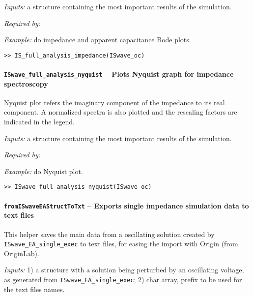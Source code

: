 	\textit{Inputs:} a structure containing the most important results of the simulation.



	\textit{Required by:}

	\textit{Example:} do impedance and apparent capacitance Bode plots.
	\begin{lstlisting}[style=Matlab-editor]
>> IS_full_analysis_impedance(ISwave_oc)
\end{lstlisting}

	\paragraph{\texttt{ISwave\_full\_analysis\_nyquist} -- Plots Nyquist graph for impedance spectroscopy}
	Nyquist plot refers the imaginary component of the impedance to its real component.
	A normalized spectra is also plotted and the rescaling factors are indicated in the legend.

	\textit{Inputs:} a structure containing the most important results of the simulation.



	\textit{Required by:}

	\textit{Example:} do Nyquist plot.
	\begin{lstlisting}[style=Matlab-editor]
>> ISwave_full_analysis_nyquist(ISwave_oc)
\end{lstlisting}




	\paragraph{\texttt{from\-ISwaveEA\-Struct\-ToTxt} -- Exports single impedance simulation data to text files}
	This helper saves the main data from a oscillating solution created by \texttt{ISwave\_EA\_single\_exec} to text files, for easing the import with Origin (from OriginLab).

	\textit{Inputs:} 1) a structure with a solution being perturbed by an oscillating voltage, as generated from \texttt{ISwave\_EA\_single\_exec};
	2) char array, prefix to be used for the text files names.





